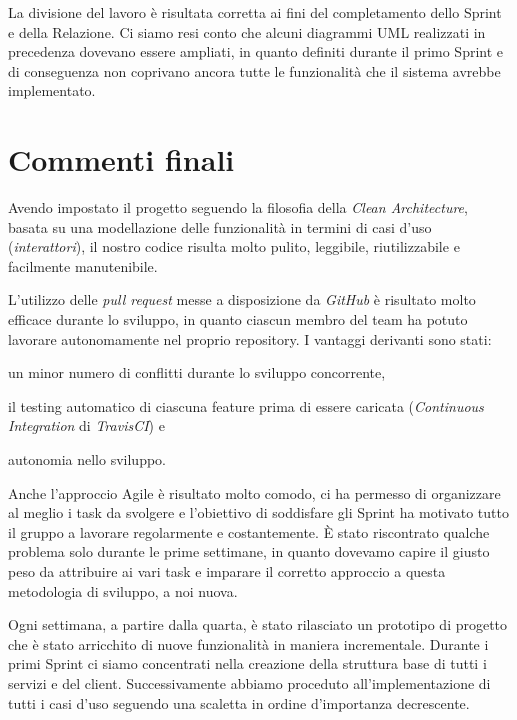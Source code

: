 La divisione del lavoro è risultata corretta ai fini del completamento dello Sprint e della Relazione. Ci siamo resi conto che alcuni diagrammi UML realizzati in precedenza dovevano essere ampliati, in quanto definiti durante il primo Sprint e di conseguenza non coprivano ancora tutte le funzionalità che il sistema avrebbe implementato. 

\section{Commenti finali}
Avendo impostato il progetto seguendo la filosofia della \textit{Clean Architecture}, basata su una modellazione delle funzionalità in termini di casi d'uso (\textit{interattori}), il nostro codice risulta molto pulito, leggibile, riutilizzabile e facilmente manutenibile.

L'utilizzo delle \textit{pull request} messe a disposizione da \textit{GitHub} è risultato molto efficace durante lo sviluppo, in quanto ciascun membro del team ha potuto lavorare autonomamente nel proprio repository.
I vantaggi derivanti sono stati:
\begin{enumerate*}[label=(\arabic*)]
%
    \item un minor numero di conflitti durante lo sviluppo concorrente,
%
    \item il testing automatico di ciascuna feature prima di essere caricata (\textit{Continuous Integration} di \textit{TravisCI}) e
%
    \item autonomia nello sviluppo.
%
\end{enumerate*}

Anche l'approccio Agile è risultato molto comodo, ci ha permesso di organizzare al meglio i task da svolgere e l'obiettivo di soddisfare gli Sprint ha motivato tutto il gruppo a lavorare regolarmente e costantemente.
\`E stato riscontrato qualche problema solo durante le prime settimane, in quanto dovevamo capire il giusto peso da attribuire ai vari task e imparare il corretto approccio a questa metodologia di sviluppo, a noi nuova.

Ogni settimana, a partire dalla quarta, è stato rilasciato un prototipo di progetto che è stato arricchito di nuove funzionalità in maniera incrementale.
%
Durante i  primi Sprint ci siamo concentrati nella creazione della struttura base di tutti i servizi e del client. Successivamente abbiamo proceduto all'implementazione di tutti i casi d'uso seguendo una scaletta in ordine d'importanza decrescente.

